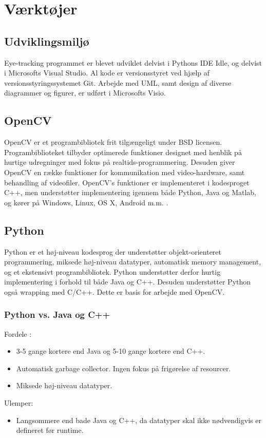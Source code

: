 \documentclass[rapport.tex]{subfiles}
\begin{document}
\section{Værktøjer}
	\subsection{Udviklingsmiljø}
	Eye-tracking programmet er blevet udviklet delvist i Pythons IDE Idle, og delvist i Microsofts Visual Studio. Al kode er versionsstyret ved hjælp af versionsstyringssystemet Git. Arbejde med UML, samt design af diverse diagrammer og figurer, er udført i Microsofts Visio. 
	\subsection{OpenCV}
	OpenCV er et programbibliotek frit tilgængeligt under BSD licensen. Programbiblioteket tilbyder optimerede funktioner designet med henblik på hurtige udregninger med fokus på realtids-programmering. Desuden giver OpenCV en række funktioner for kommunikation med video-hardware, samt behandling af videofiler. OpenCV's funktioner er implementeret i kodesproget C++, men understøtter implementering igennem både Python, Java og Matlab, og kører på Windows, Linux, OS X, Android m.m. \cite{opencv}.
	\subsection{Python}
	Python er et høj-niveau kodesprog der understøtter objekt-orienteret programmering, miksede høj-niveau datatyper, automatisk memory management, og et ekstensivt programbibliotek. 
	Python understøtter derfor hurtig implementering i forhold til både Java og C++. Desuden understøtter Python også wrapping med C/C++. Dette er basis for arbejde med OpenCV.  
	\subsubsection{Python vs. Java og C++} 
	
	Fordele \cite{PythonComp}: \begin{itemize}
		\item 3-5 gange kortere end Java og 5-10 gange kortere end C++. 
		\item Automatisk garbage collector. Ingen fokus på frigørelse af resourcer. 
		\item Miksede høj-niveau datatyper.
	\end{itemize}
	Ulemper: \begin{itemize}
		\item Langsommere end bade Java og C++, da datatyper skal ikke nødvendigvis er defineret før runtime. 
	\end{itemize}
	
\end{document}
